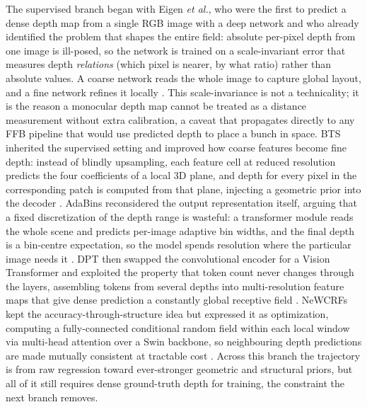 The supervised branch began with Eigen \textit{et al.}, who were the first to predict a dense depth map from a single RGB image with a deep network and who already identified the problem that shapes the entire field: absolute per-pixel depth from one image is ill-posed, so the network is trained on a scale-invariant error that measures depth \emph{relations} (which pixel is nearer, by what ratio) rather than absolute values. A coarse network reads the whole image to capture global layout, and a fine network refines it locally \cite{eigen2014depth}. This scale-invariance is not a technicality; it is the reason a monocular depth map cannot be treated as a distance measurement without extra calibration, a caveat that propagates directly to any FFB pipeline that would use predicted depth to place a bunch in space. BTS inherited the supervised setting and improved how coarse features become fine depth: instead of blindly upsampling, each feature cell at reduced resolution predicts the four coefficients of a local 3D plane, and depth for every pixel in the corresponding patch is computed from that plane, injecting a geometric prior into the decoder \cite{lee2019bts}. AdaBins reconsidered the output representation itself, arguing that a fixed discretization of the depth range is wasteful: a transformer module reads the whole scene and predicts per-image adaptive bin widths, and the final depth is a bin-centre expectation, so the model spends resolution where the particular image needs it \cite{bhat2021adabins}. DPT then swapped the convolutional encoder for a Vision Transformer and exploited the property that token count never changes through the layers, assembling tokens from several depths into multi-resolution feature maps that give dense prediction a constantly global receptive field \cite{ranftl2021dpt}. NeWCRFs kept the accuracy-through-structure idea but expressed it as optimization, computing a fully-connected conditional random field within each local window via multi-head attention over a Swin backbone, so neighbouring depth predictions are made mutually consistent at tractable cost \cite{yuan2022newcrfs}. Across this branch the trajectory is from raw regression toward ever-stronger geometric and structural priors, but all of it still requires dense ground-truth depth for training, the constraint the next branch removes.

